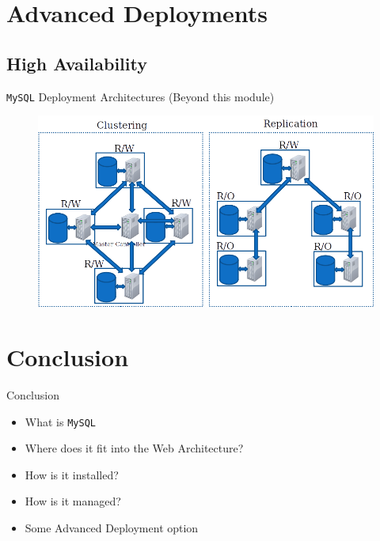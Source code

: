 \documentclass[xcolor=table]{beamer}
\begin{document}
\section{Advanced Deployments}
\subsection{High Availability}
\begin{frame}{\texttt{MySQL} Deployment Architectures \small{(Beyond this module)}}
  \begin{figure}
    \begin{center}
      \includegraphics[width=1\linewidth]{Advanced.png}
    \end{center}
  \end{figure}
\end{frame}

\section*{Conclusion}
\begin{frame}{Conclusion}
  \begin{itemize}
    \item What is \texttt{MySQL}
    \item Where does it fit into the Web Architecture?
    \item How is it installed?
    \item How is it managed?
    \item Some Advanced Deployment option 
  \end{itemize}
\end{frame}
\end{document}
